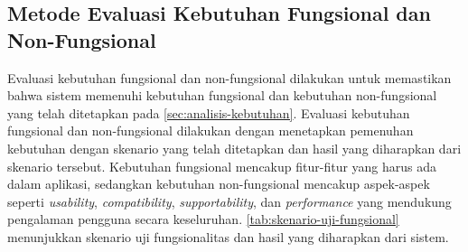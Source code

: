 \subsection{Metode Evaluasi Kebutuhan Fungsional dan Non-Fungsional}
\label{subsec:evaluasi-kebutuhan-fungsional-dan-non-fungsional}
Evaluasi kebutuhan fungsional dan non-fungsional dilakukan untuk memastikan bahwa sistem memenuhi kebutuhan fungsional dan kebutuhan non-fungsional yang telah ditetapkan pada \autoref{sec:analisis-kebutuhan}. Evaluasi kebutuhan fungsional dan non-fungsional dilakukan dengan menetapkan pemenuhan kebutuhan dengan skenario yang telah ditetapkan dan hasil yang diharapkan dari skenario tersebut. Kebutuhan fungsional mencakup fitur-fitur yang harus ada dalam aplikasi, sedangkan kebutuhan non-fungsional mencakup aspek-aspek seperti \emph{usability}, \emph{compatibility}, \emph{supportability}, dan \emph{performance} yang mendukung pengalaman pengguna secara keseluruhan. \autoref{tab:skenario-uji-fungsional} menunjukkan skenario uji fungsionalitas dan hasil yang diharapkan dari sistem.


